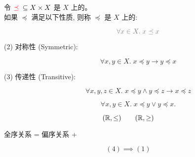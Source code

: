 
\begin{frame}{}
  \begin{definition}
    令 $\textcolor{red}{\preceq} \;\subseteq X \times X$ 是 $X$ 上的。\\[3pt]
    如果 $\preceq$ 满足以下性质, 则称 $\preceq$ 是 $X$ 上的: \\[6pt]
    \begin{description}
      \item[]
        \[
          \gray{\forall x \in X.\; x \preceq x}
        \]
      \item[(2) 对称性 (Symmetric):]
        \[
          \forall x, y \in X.\; x \preceq y \to y \preceq x
        \]
      \item[(3) 传递性 (Transitive):]
        \[
          \forall x, y, z \in X.\; x \preceq y \land y \preceq z \to x \preceq z
        \]
      \item[]
        \[
          \forall x, y \in X.\; x \preceq y \lor y \preceq x.
        \]
    \end{description}
  \end{definition}
\end{frame}

\begin{frame}{}
  \[
    (\mathbb{R}, \le) \qquad (\mathbb{R}, \ge)
  \]

  \vspace{0.60cm}
  \begin{center}
    全序关系 = 偏序关系 + 
  \end{center}

  \vspace{0.30cm}
  \[
    (4) \implies (1)
  \]
\end{frame}

